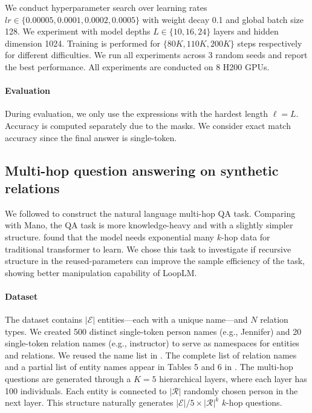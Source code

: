 \documentclass[]{bytedance_seed}
\newcommand{\1}{\mathbf{1}}
\newcommand{\ut}{LoopLM}
\begin{document}
We conduct hyperparameter search over learning rates $lr \in \{0.00005, 0.0001, 0.0002, 0.0005\}$
with weight decay 0.1 and global batch size 128. We experiment with model depths $L \in \{10, 16, 24\}$ layers and hidden dimension 1024. Training is performed for $\{80K, 110K, 200K\}
$ steps respectively for different difficulties. We run all experiments across 3 random seeds and report the best performance. All experiments are conducted on 8 H200 GPUs.

\paragraph{Evaluation} During evaluation, we only use the expressions with the hardest length $\ell=L$. Accuracy is computed separately due to the masks. We consider exact match accuracy since the final answer is single-token.



\subsection{Multi-hop question answering on synthetic relations}
\label{appendix:multihop}
We followed \cite{yao2025language} to construct the natural language multi-hop QA task. Comparing with Mano, the QA task is more knowledge-heavy and with a slightly simpler structure. \cite{yao2025language} found that the model needs exponential many $k$-hop data for traditional transformer to learn. We chose this task to investigate if recursive structure in the reused-parameters can improve the sample efficiency of the task, showing better manipulation capability of \ut{}.

\paragraph{Dataset} The dataset contains 
$|\mathcal{E}|$ entities—each with a unique name—and 
$N$ relation types. We created 500 distinct single-token person names (e.g., Jennifer) and 20 single-token relation names (e.g., instructor) to serve as namespaces for entities and relations. We reused the name list in \cite{yao2025language}. The complete list of relation names and a partial list of entity names appear in Tables 5 and 6 in \cite{yao2025language}. The multi-hop questions are generated through a $K=5$ hierarchical layers, where each layer has 100 individuals. Each entity is connected to $|\mathcal{R}|$ randomly chosen person in the next layer. This structure naturally generates $|\mathcal{E}|/5 \times |\mathcal{R}|^k$ $k$-hop questions. 
\end{document}
